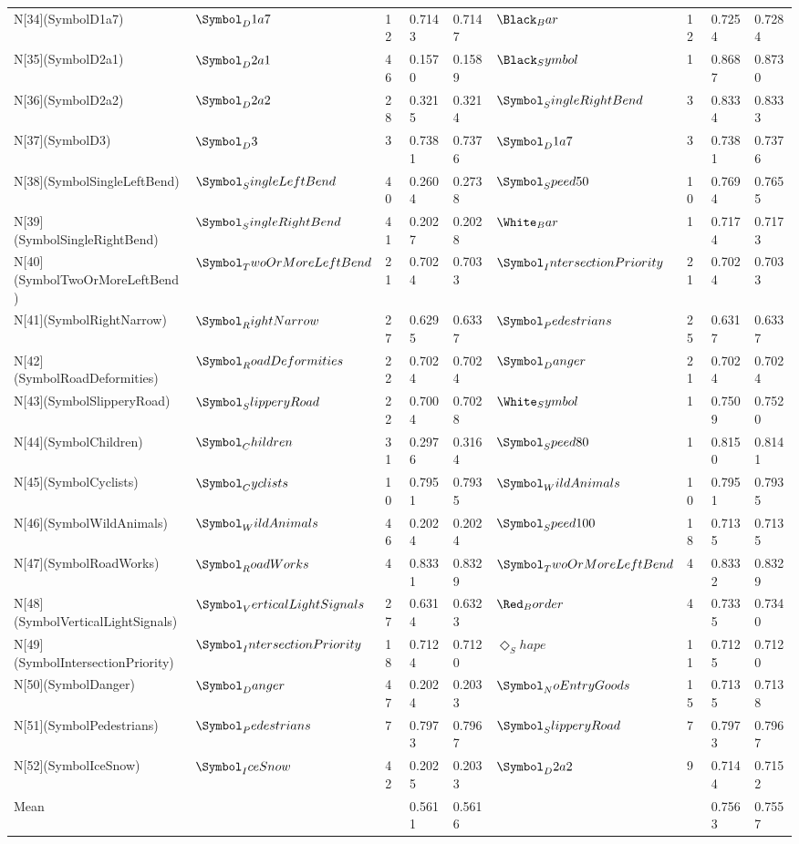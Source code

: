 \begin{tabular}{lllllllll}
N[34](SymbolD1a7) & $\Symbol_D1a7$ & 12 & 0.7143 & 0.7147 & $\Black_Bar$ & 12 & 0.7254 & 0.7284 \\
N[35](SymbolD2a1) & $\Symbol_D2a1$ & 46 & 0.1570 & 0.1589 & $\Black_Symbol$ & 1 & 0.8687 & 0.8730 \\
N[36](SymbolD2a2) & $\Symbol_D2a2$ & 28 & 0.3215 & 0.3214 & $\Symbol_SingleRightBend$ & 3 & 0.8334 & 0.8333 \\
N[37](SymbolD3) & $\Symbol_D3$ & 3 & 0.7381 & 0.7376 & $\Symbol_D1a7$ & 3 & 0.7381 & 0.7376 \\
N[38](SymbolSingleLeftBend) & $\Symbol_SingleLeftBend$ & 40 & 0.2604 & 0.2738 & $\Symbol_Speed50$ & 10 & 0.7694 & 0.7655 \\
N[39](SymbolSingleRightBend) & $\Symbol_SingleRightBend$ & 41 & 0.2027 & 0.2028 & $\White_Bar$ & 1 & 0.7174 & 0.7173 \\
N[40](SymbolTwoOrMoreLeftBend) & $\Symbol_TwoOrMoreLeftBend$ & 21 & 0.7024 & 0.7033 & $\Symbol_IntersectionPriority$ & 21 & 0.7024 & 0.7033 \\
N[41](SymbolRightNarrow) & $\Symbol_RightNarrow$ & 27 & 0.6295 & 0.6337 & $\Symbol_Pedestrians$ & 25 & 0.6317 & 0.6337 \\
N[42](SymbolRoadDeformities) & $\Symbol_RoadDeformities$ & 22 & 0.7024 & 0.7024 & $\Symbol_Danger$ & 21 & 0.7024 & 0.7024 \\
N[43](SymbolSlipperyRoad) & $\Symbol_SlipperyRoad$ & 22 & 0.7004 & 0.7028 & $\White_Symbol$ & 1 & 0.7509 & 0.7520 \\
N[44](SymbolChildren) & $\Symbol_Children$ & 31 & 0.2976 & 0.3164 & $\Symbol_Speed80$ & 1 & 0.8150 & 0.8141 \\
N[45](SymbolCyclists) & $\Symbol_Cyclists$ & 10 & 0.7951 & 0.7935 & $\Symbol_WildAnimals$ & 10 & 0.7951 & 0.7935 \\
N[46](SymbolWildAnimals) & $\Symbol_WildAnimals$ & 46 & 0.2024 & 0.2024 & $\Symbol_Speed100$ & 18 & 0.7135 & 0.7135 \\
N[47](SymbolRoadWorks) & $\Symbol_RoadWorks$ & 4 & 0.8331 & 0.8329 & $\Symbol_TwoOrMoreLeftBend$ & 4 & 0.8332 & 0.8329 \\
N[48](SymbolVerticalLightSignals) & $\Symbol_VerticalLightSignals$ & 27 & 0.6314 & 0.6323 & $\Red_Border$ & 4 & 0.7335 & 0.7340 \\
N[49](SymbolIntersectionPriority) & $\Symbol_IntersectionPriority$ & 18 & 0.7124 & 0.7120 & $\Diamond_Shape$ & 11 & 0.7125 & 0.7120 \\
N[50](SymbolDanger) & $\Symbol_Danger$ & 47 & 0.2024 & 0.2033 & $\Symbol_NoEntryGoods$ & 15 & 0.7135 & 0.7138 \\
N[51](SymbolPedestrians) & $\Symbol_Pedestrians$ & 7 & 0.7973 & 0.7967 & $\Symbol_SlipperyRoad$ & 7 & 0.7973 & 0.7967 \\
N[52](SymbolIceSnow) & $\Symbol_IceSnow$ & 42 & 0.2025 & 0.2033 & $\Symbol_D2a2$ & 9 & 0.7144 & 0.7152 \\
Mean &  &  & 0.5611 & 0.5616 &  &  & 0.7563 & 0.7557 \\
\bottomrule
\end{tabular}
